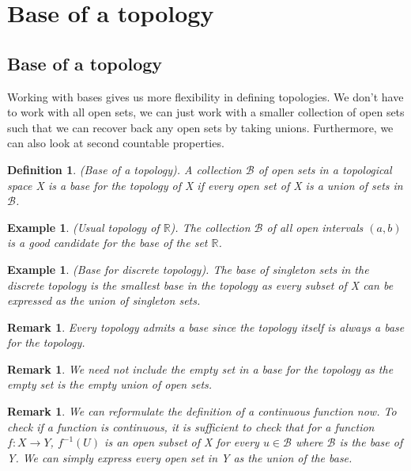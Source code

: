 \documentclass[twoside]{article}
\newtheorem{definition}[theorem]{Definition}
\newtheorem{remark}[theorem]{Remark}
\newtheorem{example}[theorem]{Example}
\begin{document}
\section{Base of a topology}
\subsection{Base of a topology}
Working with bases gives us more flexibility in defining topologies. We don't have to work with all open sets, we can just work with a smaller collection of open sets such that we can recover back any open sets by taking unions. Furthermore, we can also look at second countable properties.

\begin{definition}(Base of a topology). A collection $\mathcal{B}$ of open sets in a topological space X is a base for the topology of X if every open set of X is a union of sets in $\mathcal{B}$.
\end{definition}

\begin{example} (Usual topology of $\mathbb{R}$). The collection $\mathcal{B}$ of all open intervals $(a,b)$ is a good candidate for the base of the set $\mathbb{R}$.
\end{example}

\begin{example}(Base for discrete topology). The base of singleton sets in the discrete topology is the smallest base in the topology as every subset of X can be expressed as the union of singleton sets.
\end{example}

\begin{remark}Every topology admits a base since the topology itself is always a base for the topology.
\end{remark}

\begin{remark}We need not include the empty set in a base for the topology as the empty set is the empty union of open sets.
\end{remark}

\begin{remark}We can reformulate the definition of a continuous function now. To check if a function is continuous, it is sufficient to check that for a function $f:X\rightarrow Y$, $f^{-1}(U)$ is an open subset of X for every $u \in \mathcal{B}$ where $\mathcal{B}$ is the base of Y. We can simply express every open set in Y as the union of the base.
\end{remark}
\end{document}
